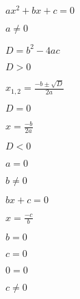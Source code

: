 \documentclass{article}
\begin{document}
$ ax^2 + bx + c = 0 $
\pagebreak

$ a \neq 0 $
\pagebreak

$ D = b^2 - 4ac$
\pagebreak

$ D > 0 $
\pagebreak

$ x_{1,2} = \frac{-b \pm \sqrt{D}}{2a} $
\pagebreak

$ D = 0 $
\pagebreak

$ x = \frac{-b}{2a} $
\pagebreak

$ D < 0 $
\pagebreak

$ a = 0 $
\pagebreak

$ b \neq 0 $
\pagebreak

$ bx + c = 0 $
\pagebreak

$ x = \frac{-c}{b} $
\pagebreak

$ b = 0 $
\pagebreak

$ c = 0 $
\pagebreak

$ 0 = 0 $
\pagebreak

$ c \neq 0 $
\pagebreak
\end{document}

